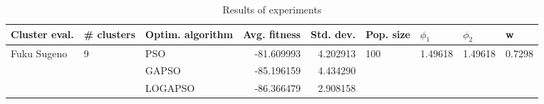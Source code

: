 \begin{table}
\centering
\caption{Results of experiments}
\begin{tabular}{lllrrllll}
\toprule
               Cluster eval. &        \# clusters & Optim. algorithm &  Avg. fitness &  Std. dev. &            Pop. size &               $\phi_{1}$ &               $\phi_{2}$ &                       w \\
\midrule
\multirow{3}{*}{Fuku Sugeno} & \multirow{3}{*}{9} &              PSO &    -81.609993 &   4.202913 & \multirow{3}{*}{100} & \multirow{3}{*}{1.49618} & \multirow{3}{*}{1.49618} & \multirow{3}{*}{0.7298} \\
                             &                    &            GAPSO &    -85.196159 &   4.434290 &                      &                          &                          &                         \\
                             &                    &          LOGAPSO &    -86.366479 &   2.908158 &                      &                          &                          &                         \\
\bottomrule
\end{tabular}
\end{table}
